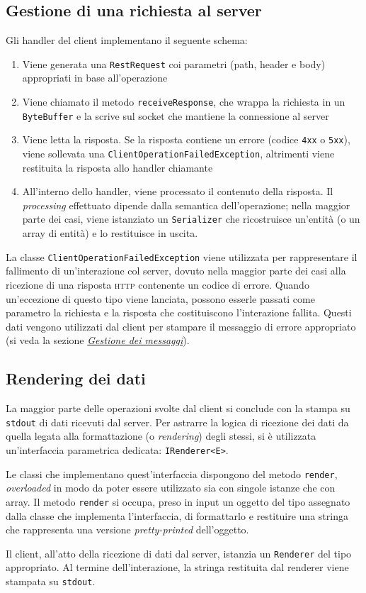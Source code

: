 \documentclass[a4paper,8pt]{article} %
\def\code#1{\texttt{#1}}
\begin{document}
\subsection{Gestione di una richiesta al server}
Gli handler del client implementano il seguente schema:
\begin{enumerate}
    \item Viene generata una \code{RestRequest} coi parametri (path, header e body) appropriati in base all'operazione
    \item Viene chiamato il metodo \code{receiveResponse}, che wrappa la richiesta in un \code{ByteBuffer} e la scrive sul socket che mantiene la connessione al server
    \item Viene letta la risposta. Se la risposta contiene un errore (codice \code{4xx} o \code{5xx}), viene sollevata una \code{ClientOperationFailedException}, altrimenti viene restituita la risposta allo handler chiamante
    \item All'interno dello handler, viene processato il contenuto della risposta. Il \emph{processing} effettuato dipende dalla semantica dell'operazione; nella maggior parte dei casi, viene istanziato un \code{Serializer} che ricostruisce un'entità (o un array di entità) e lo restituisce in uscita.
\end{enumerate}
La classe \code{ClientOperationFailedException} viene utilizzata per rappresentare il fallimento di un'interazione col server, dovuto nella maggior parte dei casi alla ricezione di una risposta \textsc{http} contenente un codice di errore.
Quando un'eccezione di questo tipo viene lanciata, possono esserle passati come parametro la richiesta e la risposta che costituiscono l'interazione fallita. Questi dati vengono utilizzati dal client per stampare il messaggio di errore appropriato (si veda la sezione \hyperref[sec:err_handling]{\emph{Gestione dei messaggi}}).

\subsection{Rendering dei dati}
La maggior parte delle operazioni svolte dal client si conclude con la stampa su \code{stdout} di dati ricevuti dal server. Per astrarre la logica di ricezione dei dati da quella
legata alla formattazione (o \emph{rendering}) degli stessi, si è utilizzata un'interfaccia parametrica dedicata: \code{IRenderer<E>}.

\par Le classi che implementano quest'interfaccia dispongono del metodo \code{render}, \emph{overloaded} in modo da poter essere utilizzato sia con singole istanze che con array. Il metodo
\code{render} si occupa, preso in input un oggetto del tipo assegnato dalla classe che implementa l'interfaccia, di formattarlo e restituire una stringa che rappresenta una versione \emph{pretty-printed} dell'oggetto.
\par Il client, all'atto della ricezione di dati dal server, istanzia un \code{Renderer} del tipo appropriato. Al termine dell'interazione, la stringa restituita dal renderer viene stampata su \code{stdout}.
\end{document}
